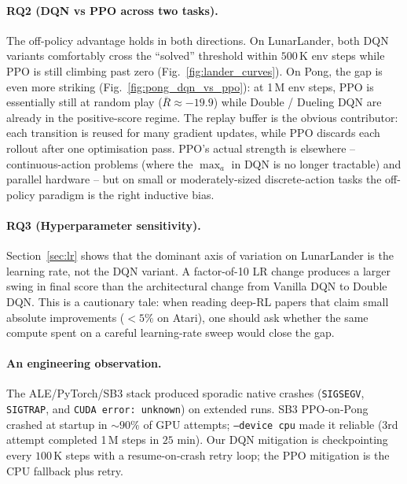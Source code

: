 \documentclass[12pt]{article}
\begin{document}
\paragraph{RQ2 (DQN vs PPO across two tasks).} The off-policy advantage
holds in both directions. On LunarLander, both DQN variants comfortably
cross the ``solved'' threshold within $500$\,K env steps while PPO is
still climbing past zero (Fig.~\ref{fig:lander_curves}). On Pong, the
gap is even more striking
(Fig.~\ref{fig:pong_dqn_vs_ppo}): at 1\,M env steps, PPO is essentially
still at random play ($\overline{R}\approx -19.9$) while
Double / Dueling DQN are already in the positive-score regime. The
replay buffer is the obvious contributor: each transition is reused for
many gradient updates, while PPO discards each rollout after one
optimisation pass. PPO's actual strength is elsewhere -- continuous-action
problems (where the $\max_{a}$ in DQN is no longer tractable) and
parallel hardware -- but on small or moderately-sized discrete-action
tasks the off-policy paradigm is the right inductive bias.

\paragraph{RQ3 (Hyperparameter sensitivity).} Section~\ref{sec:lr} shows that
the dominant axis of variation on LunarLander is the learning rate, not the
DQN variant. A factor-of-10 LR change produces a larger swing in final score
than the architectural change from Vanilla DQN to Double DQN. This is a
cautionary tale: when reading deep-RL papers that claim small absolute
improvements ($< 5\%$ on Atari), one should ask whether the same compute
spent on a careful learning-rate sweep would close the gap.

\paragraph{An engineering observation.} The ALE/PyTorch/SB3 stack produced
sporadic native crashes (\texttt{SIGSEGV}, \texttt{SIGTRAP}, and
\texttt{CUDA error: unknown}) on extended runs. SB3 PPO-on-Pong crashed
at startup in $\sim\!90\%$ of GPU attempts; \texttt{--device cpu} made it
reliable (3rd attempt completed 1\,M steps in $25$ min). Our DQN
mitigation is checkpointing every $100$\,K steps with a resume-on-crash
retry loop; the PPO mitigation is the CPU fallback plus retry.
\end{document}
